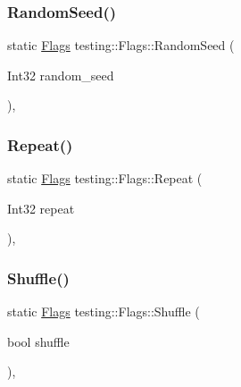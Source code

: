 \mbox{\label{structtesting_1_1_flags_a695cd8b8ab44df5eaa371bacded78c05}} 
\subsubsection{\texorpdfstring{Random\+Seed()}{RandomSeed()}}
{\footnotesize\ttfamily static \hyperlink{structtesting_1_1_flags}{Flags} testing\+::\+Flags\+::\+Random\+Seed (\begin{DoxyParamCaption}\item[{Int32}]{random\+\_\+seed }\end{DoxyParamCaption})\hspace{0.3cm}{\ttfamily [inline]}, {\ttfamily [static]}}

\mbox{\label{structtesting_1_1_flags_a19d47e87d77a18ef4fa8a85b74e25956}} 
\subsubsection{\texorpdfstring{Repeat()}{Repeat()}}
{\footnotesize\ttfamily static \hyperlink{structtesting_1_1_flags}{Flags} testing\+::\+Flags\+::\+Repeat (\begin{DoxyParamCaption}\item[{Int32}]{repeat }\end{DoxyParamCaption})\hspace{0.3cm}{\ttfamily [inline]}, {\ttfamily [static]}}

\mbox{\label{structtesting_1_1_flags_a19ddbbaed61bda44a1940333b7c5a469}} 
\subsubsection{\texorpdfstring{Shuffle()}{Shuffle()}}
{\footnotesize\ttfamily static \hyperlink{structtesting_1_1_flags}{Flags} testing\+::\+Flags\+::\+Shuffle (\begin{DoxyParamCaption}\item[{bool}]{shuffle }\end{DoxyParamCaption})\hspace{0.3cm}{\ttfamily [inline]}, {\ttfamily [static]}}

